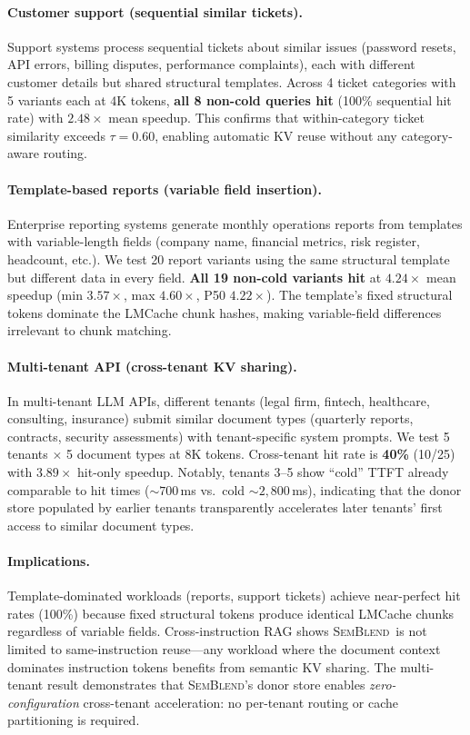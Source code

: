 \documentclass[10pt,twocolumn]{article}
\newcommand{\semblend}{\textsc{SemBlend}\xspace}
\begin{document}
\paragraph{Customer support (sequential similar tickets).}
Support systems process sequential tickets about similar issues (password
resets, API errors, billing disputes, performance complaints), each with
different customer details but shared structural templates.
Across 4 ticket categories with 5 variants each at 4K tokens,
\textbf{all 8 non-cold queries hit} (100\% sequential hit rate) with
$2.48\times$ mean speedup. This confirms that within-category ticket
similarity exceeds $\tau{=}0.60$, enabling automatic KV reuse without any
category-aware routing.

\paragraph{Template-based reports (variable field insertion).}
Enterprise reporting systems generate monthly operations reports from
templates with variable-length fields (company name, financial metrics,
risk register, headcount, etc.). We test 20 report variants using the
same structural template but different data in every field.
\textbf{All 19 non-cold variants hit} at $4.24\times$ mean speedup
(min $3.57\times$, max $4.60\times$, P50 $4.22\times$). The template's
fixed structural tokens dominate the LMCache chunk hashes, making
variable-field differences irrelevant to chunk matching.

\paragraph{Multi-tenant API (cross-tenant KV sharing).}
In multi-tenant LLM APIs, different tenants (legal firm, fintech,
healthcare, consulting, insurance) submit similar document types
(quarterly reports, contracts, security assessments) with tenant-specific
system prompts. We test 5 tenants $\times$ 5 document types at 8K tokens.
Cross-tenant hit rate is \textbf{40\%} (10/25) with $3.89\times$
hit-only speedup. Notably, tenants 3--5 show ``cold'' TTFT already
comparable to hit times (${\sim}700$\,ms vs.\ cold ${\sim}2{,}800$\,ms),
indicating that the donor store populated by earlier tenants transparently
accelerates later tenants' first access to similar document types.

\paragraph{Implications.}
Template-dominated workloads (reports, support tickets) achieve
near-perfect hit rates (100\%) because fixed structural tokens
produce identical LMCache chunks regardless of variable fields.
Cross-instruction RAG shows \semblend\ is not limited to same-instruction
reuse---any workload where the document context dominates instruction
tokens benefits from semantic KV sharing.
The multi-tenant result demonstrates that \semblend's donor store
enables \emph{zero-configuration} cross-tenant acceleration: no per-tenant
routing or cache partitioning is required.
\end{document}
